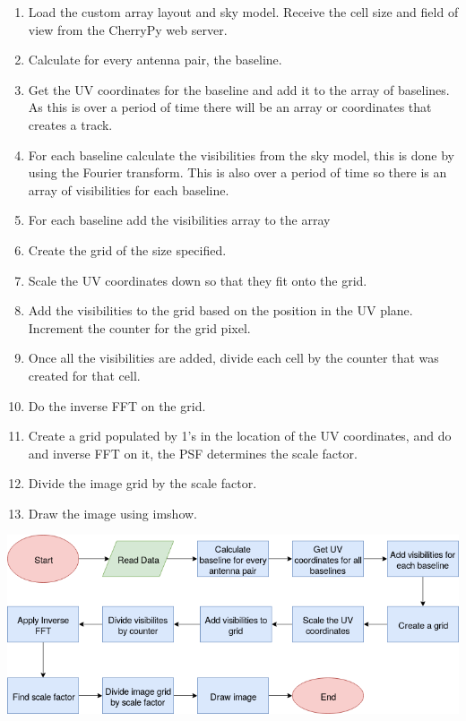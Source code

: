 \begin{enumerate}
    \item Load the custom array layout and sky model. Receive the cell size and field of view from the CherryPy web server.
    \item Calculate for every antenna pair, the baseline.
    \item Get the UV coordinates for the baseline and add it to the array of baselines. As this is over a period of time there will be an array or coordinates that creates a track.
    \item For each baseline calculate the visibilities from the sky model, this is done by using the Fourier transform. This is also over a period of time so there is an array of visibilities for each baseline.
    \item For each baseline add the visibilities array to the array
    \item Create the grid of the size specified.
    \item Scale the UV coordinates down so that they fit onto the grid.
    \item Add the visibilities to the grid based on the position in the UV plane. Increment the counter for the grid pixel.
    \item Once all the visibilities are added, divide each cell by the counter that was created for that cell.
    \item Do the inverse FFT on the grid.
    \item Create a grid populated by 1's in the location of the UV coordinates, and do and inverse FFT on it, the PSF determines the scale factor. 
    \item Divide the image grid by the scale factor.
    \item Draw the image using imshow.
\end{enumerate}
\begin{center}
    \includegraphics[scale=0.5]{images/FLOWDIAGRAM.png}
\end{center}{}

